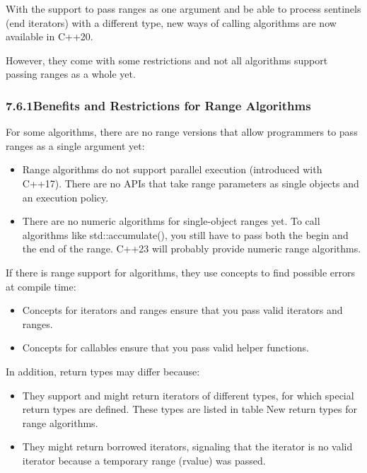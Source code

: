
With the support to pass ranges as one argument and be able to process sentinels (end iterators) with a different type, new ways of calling algorithms are now available in C++20.

However, they come with some restrictions and not all algorithms support passing ranges as a whole yet.

\subsubsection*{ 7.6.1\hspace{0.2cm}Benefits and Restrictions for Range Algorithms}

For some algorithms, there are no range versions that allow programmers to pass ranges as a single argument yet:

\begin{itemize}
\item
Range algorithms do not support parallel execution (introduced with C++17). There are no APIs that take range parameters as single objects and an execution policy.

\item
There are no numeric algorithms for single-object ranges yet. To call algorithms like std::accumulate(), you still have to pass both the begin and the end of the range. C++23 will probably provide numeric range algorithms.
\end{itemize}

If there is range support for algorithms, they use concepts to find possible errors at compile time:

\begin{itemize}
\item
Concepts for iterators and ranges ensure that you pass valid iterators and ranges.

\item
Concepts for callables ensure that you pass valid helper functions.
\end{itemize}

In addition, return types may differ because:

\begin{itemize}
\item
They support and might return iterators of different types, for which special return types are defined. These types are listed in table New return types for range algorithms.

\item
They might return borrowed iterators, signaling that the iterator is no valid iterator because a temporary range (rvalue) was passed.
\end{itemize}


